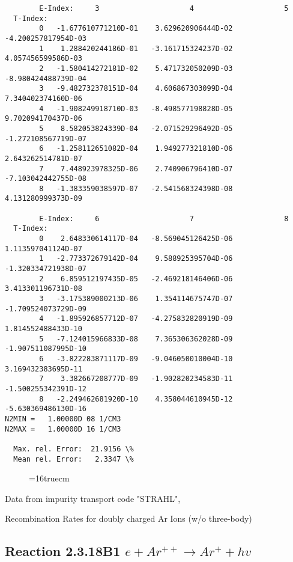 \documentclass[12pt,dvipdfmx]{article}
\begin{document}
{\begin{small}
\begin{verbatim}
        E-Index:     3                     4                     5
  T-Index:
        0   -1.677610771210D-01    3.629620906444D-02   -4.200257817954D-03
        1    1.288420244186D-01   -3.161715324237D-02    4.057456599586D-03
        2   -1.580414272181D-02    5.471732050209D-03   -8.980424488739D-04
        3   -9.482732378151D-04    4.606867303099D-04    7.340402374160D-06
        4   -1.908249918710D-03   -8.498577198828D-05    9.702094170437D-06
        5    8.582053824339D-04   -2.071529296492D-05   -1.272108567719D-07
        6   -1.258112651082D-04    1.949277321810D-06    2.643262514781D-07
        7    7.448923978325D-06    2.740906796410D-07   -7.103042442755D-08
        8   -1.383359038597D-07   -2.541568324398D-08    4.131280999373D-09

        E-Index:     6                     7                     8
  T-Index:
        0    2.648330614117D-04   -8.569045126425D-06    1.113597041124D-07
        1   -2.773372679142D-04    9.588925395704D-06   -1.320334721938D-07
        2    6.859512197435D-05   -2.469218146406D-06    3.413301196731D-08
        3   -3.175389000213D-06    1.354114675747D-07   -1.709524073729D-09
        4   -1.895926857712D-07   -4.275832820919D-09    1.814552488433D-10
        5   -7.124015966833D-08    7.365306362028D-09   -1.907511087995D-10
        6   -3.822283871117D-09   -9.046050010004D-10    3.169432383695D-11
        7    3.382667208777D-09   -1.902820234583D-11   -1.500255342391D-12
        8   -2.249462681920D-10    4.358044610945D-12   -5.630369486130D-16
N2MIN =   1.00000D 08 1/CM3
N2MAX =   1.00000D 16 1/CM3

  Max. rel. Error:  21.9156 \%
  Mean rel. Error:   2.3347 \%

\end{verbatim}\end{small}
\begin{figure} \label{2.3.18B0}
\epsfxsize=16truecm
\end{figure}
\newpage
Data from impurity transport code "STRAHL", \cite{kn:Behringer}

  Recombination Rates for doubly charged Ar Ions (w/o three-body)
\subsection{
Reaction 2.3.18B1   $  e + Ar^{++} \rightarrow  Ar^+ + hv$
}


}
\end{document}
